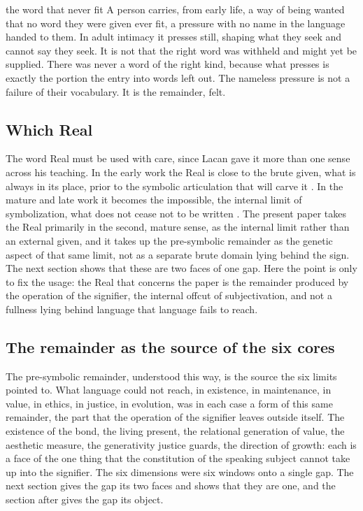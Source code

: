\begin{casebox}{the word that never fit}
A person carries, from early life, a way of being wanted that no word they were given ever fit, a pressure with no name in the language handed to them. In adult intimacy it presses still, shaping what they seek and cannot say they seek. It is not that the right word was withheld and might yet be supplied. There was never a word of the right kind, because what presses is exactly the portion the entry into words left out. The nameless pressure is not a failure of their vocabulary. It is the remainder, felt.
\end{casebox}

\subsection*{Which Real}

The word Real must be used with care, since Lacan gave it more than one sense across his teaching. In the early work the Real is close to the brute given, what is always in its place, prior to the symbolic articulation that will carve it \parencite{lacan1993iii}. In the mature and late work it becomes the impossible, the internal limit of symbolization, what does not cease not to be written \parencite{lacan1998xx}. The present paper takes the Real primarily in the second, mature sense, as the internal limit rather than an external given, and it takes up the pre-symbolic remainder as the genetic aspect of that same limit, not as a separate brute domain lying behind the sign. The next section shows that these are two faces of one gap. Here the point is only to fix the usage: the Real that concerns the paper is the remainder produced by the operation of the signifier, the internal offcut of subjectivation, and not a fullness lying behind language that language fails to reach.

\subsection*{The remainder as the source of the six cores}

The pre-symbolic remainder, understood this way, is the source the six limits pointed to. What language could not reach, in existence, in maintenance, in value, in ethics, in justice, in evolution, was in each case a form of this same remainder, the part that the operation of the signifier leaves outside itself. The existence of the bond, the living present, the relational generation of value, the aesthetic measure, the generativity justice guards, the direction of growth: each is a face of the one thing that the constitution of the speaking subject cannot take up into the signifier. The six dimensions were six windows onto a single gap. The next section gives the gap its two faces and shows that they are one, and the section after gives the gap its object.
